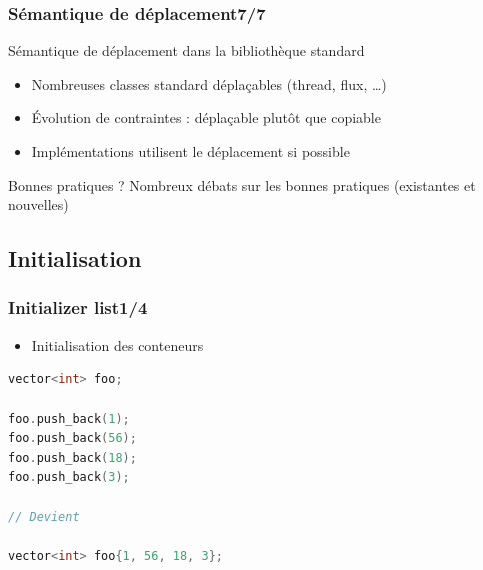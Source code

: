 \documentclass[C++.tex]{subfiles}
\begin{document}
\begin{frame}
	\frametitle{Sémantique de déplacement\titlehfill{}7/7}
	\begin{block}{Sémantique de déplacement dans la bibliothèque standard}
		\begin{itemize}
			\item Nombreuses classes standard déplaçables (thread, flux, \ldots)


			\item Évolution de contraintes : déplaçable plutôt que copiable

			
			\item Implémentations utilisent le déplacement si possible
		\end{itemize}
	\end{block}

	\begin{alertblock}{Bonnes pratiques ?}
		Nombreux débats sur les bonnes pratiques (existantes et nouvelles)

	\end{alertblock}
\end{frame}

\subsection*{Initialisation}
\begin{frame}[fragile]
	\frametitle{Initializer list\titlehfill{}1/4}
	\begin{itemize}
		\item Initialisation des conteneurs
	\end{itemize}

	\begin{lstlisting}[language=C++]
vector<int> foo;

foo.push_back(1);
foo.push_back(56);
foo.push_back(18);
foo.push_back(3);

// Devient

vector<int> foo{1, 56, 18, 3};\end{lstlisting}
\end{frame}
\end{document}

